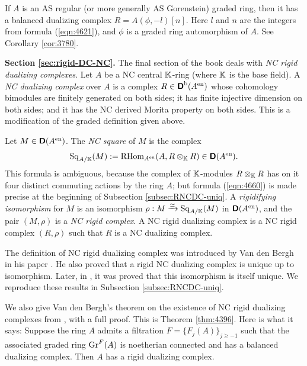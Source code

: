 If $A$ is an AS regular (or more generally AS Gorenstein) graded ring, then it 
has a balanced dualizing complex $R = A(\phi, -l)[n]$. Here $l$ and $n$ are the 
integers from formula (\ref{eqn:4621}), and $\phi$ is a graded ring 
automorphism 
of $A$. See Corollary \ref{cor:3780}. 



\medskip \noindent 
{\bf Section \ref{sec:rigid-DC-NC}.}
The final section of the book deals with {\em NC rigid dualizing complexes}. 
Let $A$ be a NC central $\mathbb{K}$-ring (where $\mathbb{K}$ is the base field). A {\em NC 
dualizing complex} over $A$ is a complex 
$R \in \boldsymbol{\mathsf{D}}^{\mathrm{b}}(A^{\mathrm{en}})$
whose cohomology bimodules are finitely generated on both sides; it has finite 
injective dimension on both sides; and it has the NC derived Morita property on 
both sides. This is a modification of the graded definition given above.

Let $M \in \boldsymbol{\mathsf{D}}(A^{\mathrm{en}})$. The {\em NC square} of $M$
is the complex 
\begin{equation} \label{eqn:4660}
\operatorname{Sq}_{A / \mathbb{K}}(M) := \operatorname{RHom}_{A^{\mathrm{en}}}(A, R \otimes_{\mathbb{K}} R) \in 
\boldsymbol{\mathsf{D}}(A^{\mathrm{en}}) .
\end{equation}
This formula is ambiguous, because  
the complex of $\mathbb{K}$-modules $R \otimes_{\mathbb{K}} R$ has on it four distinct 
commuting actions by the ring $A$; but formula (\ref{eqn:4660}) is made precise 
at the beginning of Subsection \ref{subsec:RNCDC-uniq}. 
A {\em rigidifying isomorphism} for $M$ is an isomorphism 
$\rho : M \xrightarrow{\simeq}  \operatorname{Sq}_{A / \mathbb{K}}(M)$
in $\boldsymbol{\mathsf{D}}(A^{\mathrm{en}})$, and the pair $(M, \rho)$ is a {\em NC rigid 
complex}. A NC rigid dualizing complex is a NC rigid complex $(R, \rho)$ 
such that $R$ is a NC dualizing complex. 

The definition of NC rigid dualizing complex was introduced by Van den Bergh in 
his paper \cite{VdB}. He also proved that a rigid NC dualizing complex is 
unique up to isomorphism. Later, in \cite{Ye4}, it was proved that this 
isomorphism is itself unique. We reproduce these results in Subsection 
\ref{subsec:RNCDC-uniq}.  

We also give Van den Bergh's theorem on the existence of 
NC rigid dualizing complexes from \cite{VdB}, with a full proof. 
This is Theorem \ref{thm:4396}. Here is what it says: 
Suppose the ring $A$ admits a filtration 
$F = \{ F_j(A) \}_{j \geq -1}$
such that the associated graded ring $\operatorname{Gr}^F(A)$ 
is noetherian connected and has a balanced dualizing complex. Then $A$ has a 
rigid dualizing complex. 

